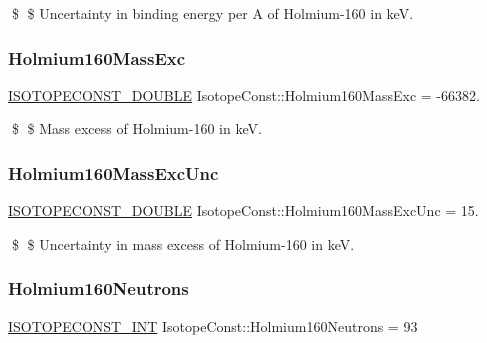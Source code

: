 \$ \$ Uncertainty in binding energy per A of Holmium-\/160 in keV. \mbox{\label{group___isotope_const-_holmium-_ho160_ga6f102d7f3496576f14c906b0fb474914}} 
\subsubsection{\texorpdfstring{Holmium160\+Mass\+Exc}{Holmium160MassExc}}
{\footnotesize\ttfamily \mbox{\hyperlink{group___isotope_const-_macros_ga8f45a7272ce02c0b4c65c44636ed719a}{I\+S\+O\+T\+O\+P\+E\+C\+O\+N\+S\+T\+\_\+\+D\+O\+U\+B\+LE}} Isotope\+Const\+::\+Holmium160\+Mass\+Exc = -\/66382.}

\$ \$ Mass excess of Holmium-\/160 in keV. \mbox{\label{group___isotope_const-_holmium-_ho160_gaa45d12c7af07cd948e12ae012d12c78f}} 
\subsubsection{\texorpdfstring{Holmium160\+Mass\+Exc\+Unc}{Holmium160MassExcUnc}}
{\footnotesize\ttfamily \mbox{\hyperlink{group___isotope_const-_macros_ga8f45a7272ce02c0b4c65c44636ed719a}{I\+S\+O\+T\+O\+P\+E\+C\+O\+N\+S\+T\+\_\+\+D\+O\+U\+B\+LE}} Isotope\+Const\+::\+Holmium160\+Mass\+Exc\+Unc = 15.}

\$ \$ Uncertainty in mass excess of Holmium-\/160 in keV. \mbox{\label{group___isotope_const-_holmium-_ho160_gae344c5a9e102a4d6bc37073aceb35a3b}} 
\subsubsection{\texorpdfstring{Holmium160\+Neutrons}{Holmium160Neutrons}}
{\footnotesize\ttfamily \mbox{\hyperlink{group___isotope_const-_macros_ga5f18360b3e99483a35c32d789e62621c}{I\+S\+O\+T\+O\+P\+E\+C\+O\+N\+S\+T\+\_\+\+I\+NT}} Isotope\+Const\+::\+Holmium160\+Neutrons = 93}

